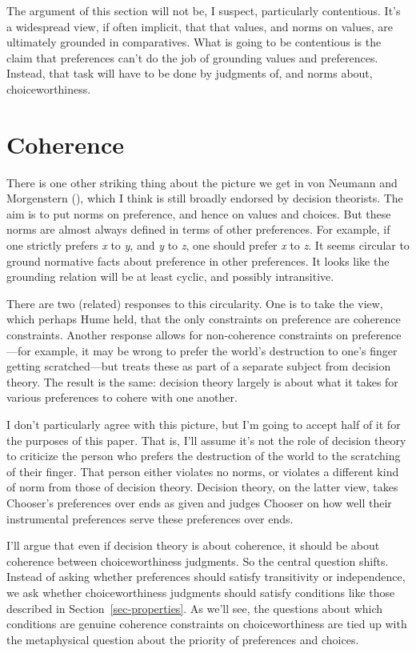 \documentclass[
  11pt,
  letterpaper,
  DIV=11,
  numbers=noendperiod,
  twoside]{scrartcl}
\begin{document}
The argument of this section will not be, I suspect, particularly
contentious. It's a widespread view, if often implicit, that that
values, and norms on values, are ultimately grounded in comparatives.
What is going to be contentious is the claim that preferences can't do
the job of grounding values and preferences. Instead, that task will
have to be done by judgments of, and norms about, choiceworthiness.

\section{Coherence}\label{sec-coherence}

There is one other striking thing about the picture we get in von
Neumann and Morgenstern (), which I
think is still broadly endorsed by decision theorists. The aim is to put
norms on preference, and hence on values and choices. But these norms
are almost always defined in terms of other preferences. For example, if
one strictly prefers \emph{x} to \emph{y}, and \emph{y} to \emph{z}, one
should prefer \emph{x} to \emph{z}. It seems circular to ground
normative facts about preference in other preferences. It looks like the
grounding relation will be at least cyclic, and possibly intransitive.

There are two (related) responses to this circularity. One is to take
the view, which perhaps Hume held, that the only constraints on
preference are coherence constraints. Another response allows for
non-coherence constraints on preference---for example, it may be wrong
to prefer the world's destruction to one's finger getting
scratched---but treats these as part of a separate subject from decision
theory. The result is the same: decision theory largely is about what it
takes for various preferences to cohere with one another.

I don't particularly agree with this picture, but I'm going to accept
half of it for the purposes of this paper. That is, I'll assume it's not
the role of decision theory to criticize the person who prefers the
destruction of the world to the scratching of their finger. That person
either violates no norms, or violates a different kind of norm from
those of decision theory. Decision theory, on the latter view, takes
Chooser's preferences over ends as given and judges Chooser on how well
their instrumental preferences serve these preferences over ends.

I'll argue that even if decision theory is about coherence, it should be
about coherence between choiceworthiness judgments. So the central
question shifts. Instead of asking whether preferences should satisfy
transitivity or independence, we ask whether choiceworthiness judgments
should satisfy conditions like those described in
Section~\ref{sec-properties}. As we'll see, the questions about which
conditions are genuine coherence constraints on choiceworthiness are
tied up with the metaphysical question about the priority of preferences
and choices.
\end{document}
